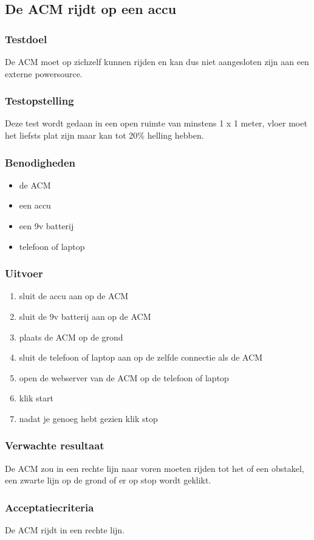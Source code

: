 \subsection{De ACM rijdt op een accu}

\subsubsection{Testdoel}
De ACM moet op zichzelf kunnen rijden en kan dus niet aangesloten zijn aan een externe powersource.
\subsubsection{Testopstelling}
\begin{flushleft}

    Deze test wordt gedaan in een open ruimte van minstens 1 x 1 meter, vloer moet het liefsts plat zijn maar kan tot 20\% helling hebben.
\end{flushleft}
\subsubsection{Benodigheden}

\begin{itemize}
    \item de ACM
    \item een accu
    \item een 9v batterij
    \item telefoon of laptop
\end{itemize}

\subsubsection{Uitvoer}
\begin{enumerate}
    \item sluit de accu aan op de ACM
    \item sluit de 9v batterij aan op de ACM
    \item plaats de ACM op de grond
    \item sluit de telefoon of laptop aan op de zelfde connectie als de ACM
    \item open de webserver van de ACM op de telefoon of laptop
    \item klik start
    \item nadat je genoeg hebt gezien klik stop
\end{enumerate}
\subsubsection{Verwachte resultaat}
\begin{flushleft}
    De ACM zou in een rechte lijn naar voren moeten rijden tot het of een obstakel, een zwarte lijn op de grond of er op stop wordt geklikt.
\end{flushleft}
\subsubsection{Acceptatiecriteria}
\begin{flushleft}
    De ACM rijdt in een rechte lijn.
\end{flushleft}
